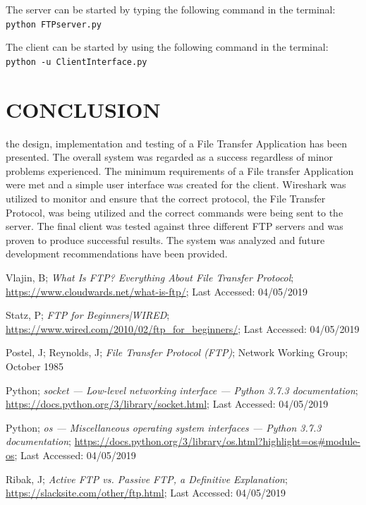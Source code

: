 \documentclass[10pt,twocolumn]{witseiepaper}
\def\code#1{\texttt{#1}}
\begin{document}
The server can be started by typing the following command in the terminal:
\code{python FTPserver.py}

The client can be started by using the following command in the terminal:
\code{python -u ClientInterface.py}

%
\section{CONCLUSION}
\label{sec: Conclusion}
the design, implementation and testing of a File Transfer Application has been presented. The overall system was regarded as a success regardless of minor problems experienced. The minimum requirements of a File transfer Application were met and a simple user interface was created for the client. Wireshark was utilized to monitor and ensure that the correct protocol, the File Transfer Protocol, was being utilized and the correct commands were being sent to the server. The final client was tested against three different FTP servers and was proven to produce successful results. The system was analyzed and future development recommendations have been provided.


%
\begin{thebibliography}{}


Vlajin, B; \emph{What Is FTP? Everything About File Transfer Protocol}; \url{https://www.cloudwards.net/what-is-ftp/}; Last Accessed: 04/05/2019

Statz, P; \emph{FTP for Beginners|WIRED}; \url{https://www.wired.com/2010/02/ftp_for_beginners/}; Last Accessed: 04/05/2019

Postel, J; Reynolds, J; \emph{File Transfer Protocol (FTP)}; Network Working Group; October 1985

Python; \emph{socket — Low-level networking interface — Python 3.7.3 documentation}; \url{https://docs.python.org/3/library/socket.html}; Last Accessed: 04/05/2019

Python; \emph{os — Miscellaneous operating system interfaces — Python 3.7.3 documentation}; \url{https://docs.python.org/3/library/os.html?highlight=os#module-os}; Last Accessed: 04/05/2019

Ribak, J; \emph{Active FTP vs. Passive FTP, a Definitive Explanation}; \url{https://slacksite.com/other/ftp.html}; Last Accessed: 04/05/2019

\end{thebibliography}
\end{document}
